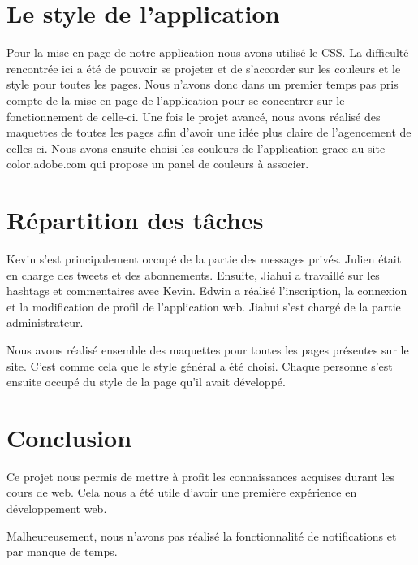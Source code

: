 \documentclass[a4paper, 12pt]{article}
\begin{document}
\section{Le style de l'application}
Pour la mise en page de notre application nous avons utilisé le CSS. La difficulté rencontrée ici a été de pouvoir se projeter et de s'accorder sur les couleurs et le style pour toutes les pages. Nous n'avons donc dans un premier temps pas pris compte de la mise en page de l'application pour se concentrer sur le fonctionnement de celle-ci.
Une fois le projet avancé, nous avons réalisé des maquettes de toutes les pages afin d'avoir une idée plus claire de l'agencement de celles-ci. Nous avons ensuite choisi les couleurs de l'application grace au site color.adobe.com qui propose un panel de couleurs à associer.


\section{Répartition des tâches}

Kevin s'est principalement occupé de la partie des messages privés. Julien était en charge des tweets et des abonnements. Ensuite, Jiahui a travaillé sur les hashtags et commentaires avec Kevin. Edwin a réalisé l'inscription, la connexion et la modification de profil de l'application web. Jiahui s'est chargé de la partie administrateur.

Nous avons réalisé ensemble des maquettes pour toutes les pages présentes sur le site. C'est comme cela que le style général a été choisi. Chaque personne s'est ensuite occupé du style de la page qu'il avait développé.

\section{Conclusion}		

Ce projet nous permis de mettre à profit les connaissances acquises durant les cours de web. Cela nous a été utile d'avoir une première expérience en développement web. 




Malheureusement, nous n'avons pas réalisé la fonctionnalité de notifications et par manque de temps. 
\end{document}
